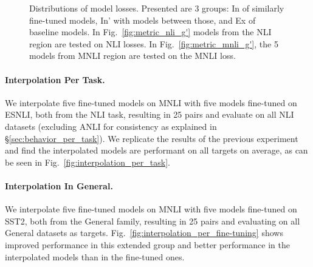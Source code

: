 \documentclass[nohyperref]{article}
\theoremstyle{plain}
\theoremstyle{definition}
\theoremstyle{remark}
\begin{document}
\begin{figure*}[t]
\centering

\hfill
{}
\hfill
{}
    
\caption{Distributions of model losses. Presented are 3 groups: In of similarly fine-tuned models, In' with models between those, and Ex of baseline models. In Fig.~\ref{fig:metric_nli_g'} models from the NLI region are tested on NLI losses. In Fig.~\ref{fig:metric_mnli_g'}, the 5 models from MNLI region are tested on the MNLI loss.} 
\label{fig:distributions}
\end{figure*}

\paragraph{Interpolation Per Task.} We interpolate five fine-tuned models on MNLI with five models fine-tuned on ESNLI, both from the NLI task, resulting in 25 pairs and evaluate on all NLI datasets (excluding ANLI for consistency as explained in \S\ref{sec:behavior_per_task}). 
We replicate the results of the previous experiment and find the interpolated models are performant on all targets on average, as can be seen in Fig.~\ref{fig:interpolation_per_task}.


\paragraph{Interpolation In General.} We interpolate five fine-tuned models on MNLI with five models fine-tuned on SST2, both from the General family, resulting in 25 pairs and evaluating on all General datasets as targets. Fig.~\ref{fig:interpolation_per_fine-tuning} shows improved performance in this extended group and better performance in the interpolated models than in the fine-tuned ones. 
\end{document}
